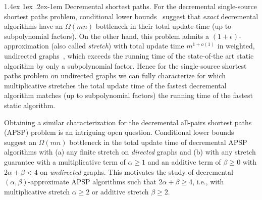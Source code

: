 \documentclass[11pt]{article}
\makeatletter
\theoremstyle{definition}
\theoremstyle{remark}
\renewcommand{\paragraph}{%
  \@startsection{paragraph}{4}%
  {\z@}{1.4ex \@plus 1ex \@minus .2ex}{-1em}%
  {\normalfont\normalsize\bfseries}%
}
\makeatother
\begin{document}
\begin{titlepage}
\paragraph{Decremental shortest paths.} For the decremental single-source shortest paths problem, conditional lower bounds~\cite{RodittyZ11,HenzingerKNS15} suggest that \emph{exact} decremental algorithms have an $\Omega(mn)$ bottleneck in their total update time (up to subpolynomial factors).
On the other hand, this problem admits a $ (1 + \epsilon) $-approximation (also called \emph{stretch}) with total update time $ m^{1 + o(1)} $ in weighted, undirected graphs~\cite{BR11,henzinger2014decremental,BernsteinC16,Bernstein17,BernsteinGS21}, which exceeds the running time of the state-of-the art static algorithm by only a subpolynomial factor. Hence for the single-source shortest paths problem on undirected graphs we can fully characterize for which multiplicative stretches the total update time of the fastest decremental algorithm matches (up to subpolynomial factors) the running time of the fastest static algorithm.

Obtaining a similar characterization for the decremental all-pairs shortest paths (APSP) problem is an intriguing open question.
Conditional lower bounds~\cite{DHZ00,HenzingerKNS15} suggest an $\Omega(mn)$ bottleneck in the total update time of decremental APSP algorithms with (a) any finite stretch on \textit{directed} graphs and (b)  with any stretch guarantee with a multiplicative term of $ \alpha \geq 1 $ and an additive term of $ \beta \geq 0 $ with $ 2 \alpha + \beta < 4 $ on \textit{undirected} graphs. This motivates the study of decremental $ (\alpha, \beta) $-approximate APSP algorithms such that $ 2 \alpha + \beta \geq 4 $, i.e., with multiplicative stretch $ \alpha \geq 2 $ or additive stretch $ \beta \geq 2 $.



\end{titlepage}
\end{document}
